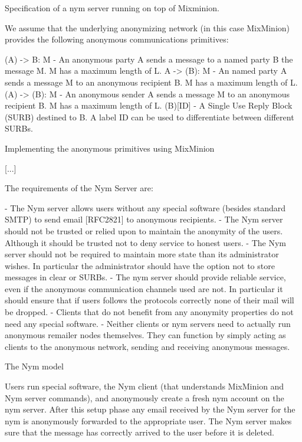 Specification of a nym server running on top of Mixminion.

We assume that the underlying anonymizing network (in this case
MixMinion) provides the following anonymous communications
primitives:

(A) -> B: M   - An anonymous party A sends a message to a named party B
                the message M. M has a maximum length of L.
A -> (B): M   - An named party A sends a message M to an anonymous
                recipient B. M has a maximum length of L.
(A) -> (B): M - An anonymous sender A sends a message M to an
                anonymous recipient B. M has a maximum length of L.
(B)[ID]       - A Single Use Reply Block (SURB) destined to B. A label
                ID can be used to differentiate between different
                SURBs.

Implementing the anonymous primitives using MixMinion

[...]

The requirements of the Nym Server are:

- The Nym server allows users without any special software (besides
  standard SMTP) to send email [RFC2821] to anonymous recipients.
- The Nym server should not be trusted or relied upon to maintain the
  anonymity of the users. Although it should be trusted not to deny
  service to honest users.
- The Nym server should not be required to maintain more state than
  its administrator wishes. In particular the administrator should
  have the option not to store messages in clear or SURBs.
- The nym server should provide reliable service, even if the
  anonymous communication channels used are not. In particular it
  should ensure that if users follows the protocols correctly none of
  their mail will be dropped.
- Clients that do not benefit from any anonymity properties do not
  need any special software.
- Neither clients or nym servers need to actually run anonymous
  remailer nodes themselves. They can function by simply acting as
  clients to the anonymous network, sending and receiving anonymous
  messages. 

The Nym model

Users run special software, the Nym client (that understands MixMinion
and Nym server commands), and anonymously create a fresh nym account on
the nym server. After this setup phase any email received by the Nym
server for the nym is anonymously forwarded to the appropriate
user. The Nym server makes sure that the message has correctly arrived
to the user before it is deleted.

